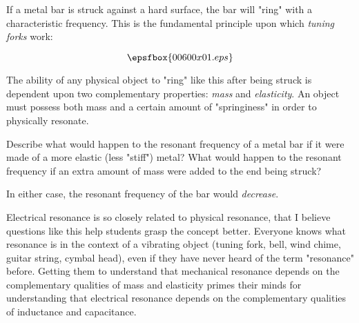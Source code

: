 

If a metal bar is struck against a hard surface, the bar will "ring" with a characteristic frequency.  This is the fundamental principle upon which {\it tuning forks} work:

$$\epsfbox{00600x01.eps}$$

The ability of any physical object to "ring" like this after being struck is dependent upon two complementary properties: {\it mass} and {\it elasticity}.  An object must possess both mass and a certain amount of "springiness" in order to physically resonate.

Describe what would happen to the resonant frequency of a metal bar if it were made of a more elastic (less "stiff") metal?  What would happen to the resonant frequency if an extra amount of mass were added to the end being struck?







In either case, the resonant frequency of the bar would {\it decrease}.







Electrical resonance is so closely related to physical resonance, that I believe questions like this help students grasp the concept better.  Everyone knows what resonance is in the context of a vibrating object (tuning fork, bell, wind chime, guitar string, cymbal head), even if they have never heard of the term "resonance" before.  Getting them to understand that mechanical resonance depends on the complementary qualities of mass and elasticity primes their minds for understanding that electrical resonance depends on the complementary qualities of inductance and capacitance.




